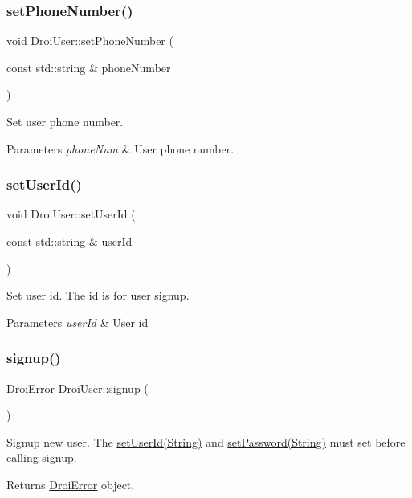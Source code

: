\subsubsection{\texorpdfstring{set\+Phone\+Number()}{setPhoneNumber()}}
{\footnotesize\ttfamily void Droi\+User\+::set\+Phone\+Number (\begin{DoxyParamCaption}\item[{const std\+::string \&}]{phone\+Number }\end{DoxyParamCaption})}

Set user phone number. 
\begin{DoxyParams}{Parameters}
{\em phone\+Num} & User phone number. \\
\hline
\end{DoxyParams}
\mbox{\label{class_droi_user_a84f5d57a02e5c7c77ea534787653bbb9}} 
\subsubsection{\texorpdfstring{set\+User\+Id()}{setUserId()}}
{\footnotesize\ttfamily void Droi\+User\+::set\+User\+Id (\begin{DoxyParamCaption}\item[{const std\+::string \&}]{user\+Id }\end{DoxyParamCaption})}

Set user id. The id is for user signup. 
\begin{DoxyParams}{Parameters}
{\em user\+Id} & User id \\
\hline
\end{DoxyParams}
\mbox{\label{class_droi_user_ae26c7f0f576a663d3ce3c5bfc03a102b}} 
\subsubsection{\texorpdfstring{signup()}{signup()}}
{\footnotesize\ttfamily \hyperlink{class_droi_error}{Droi\+Error} Droi\+User\+::signup (\begin{DoxyParamCaption}{ }\end{DoxyParamCaption})}

Signup new user. The \hyperlink{}{set\+User\+Id(\+String)} and \hyperlink{}{set\+Password(\+String)} must set before calling signup. \begin{DoxyReturn}{Returns}
\hyperlink{class_droi_error}{Droi\+Error} object. 
\end{DoxyReturn}


